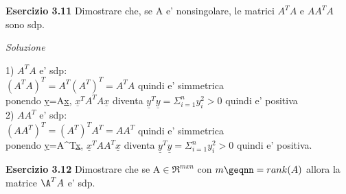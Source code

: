\documentclass[20pt,a4paper]{book}
\begin{document}
\begin{mah}
\vspace{10mm}


\textbf{\Large{Esercizio 3.11}} 
Dimostrare che, se A e' nonsingolare, le matrici \begin{math}A^{T}A\end{math} e \begin{math} AA^{T}A\end{math}sono sdp.

\textit{Soluzione}

1)
\begin{math}A^{T}A\end{math} e' sdp:\\
\begin{math}(A^{T}A)^{T}=A^{T}(A^{T})^{T}=A^{T}A\end{math} quindi e' simmetrica\\

ponendo \underline{y}=A\underline{x}, \begin{math}\underline{x}^{T}A^{T}A\underline{x}\end{math} diventa \begin{math}\underline{y}^{T}\underline{y}=\Sigma_{i=1}^{n}y_{i}^{2}>0\end{math} quindi e' positiva \\

2)
\begin{math}AA^{T}\end{math} e' sdp:\\
\begin{math}(AA^{T})^{T}=(A^{T})^{T}A^{T}=AA^{T}\end{math} quindi e' simmetrica\\

ponendo \underline{y}=A^{T}\underline{x}, \begin{math}\underline{x}^{T}AA^{T}\underline{x}\end{math} diventa \begin{math}\underline{y}^{T}\underline{y}=\Sigma_{i=1}^{n}y_{i}^{2}>0\end{math} quindi e' positiva. 

\vspace{10mm}


\textbf{\Large{Esercizio 3.12}}   %
Dimostrare che se A\begin{math}\in\Re^{mxn}\end{math} con \begin{math}m\geqnn=rank(A)\end{math}
allora la matrice \begin{math}\A^{T}A\end{math} e' sdp.


\end{mah}
\end{document}
